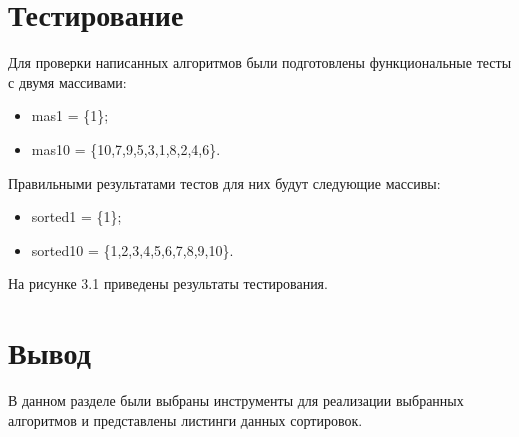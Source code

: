 \section{Тестирование}
Для проверки написанных алгоритмов были подготовлены функциональные тесты с двумя массивами:
\begin{itemize}
	\item mas1 = \{1\};
	\item mas10 = \{10,7,9,5,3,1,8,2,4,6\}.
\end{itemize}
Правильными результатами тестов для них будут следующие массивы:
\begin{itemize}
	\item sorted1 = \{1\};
	\item sorted10 = \{1,2,3,4,5,6,7,8,9,10\}.
\end{itemize}

На рисунке 3.1 приведены результаты тестирования.


\section{Вывод}
В данном разделе были выбраны инструменты для реализации выбранных алгоритмов и представлены листинги данных сортировок.